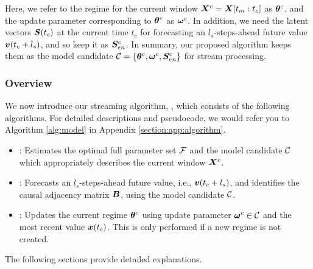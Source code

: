 \noindent Here, we refer to the regime for the current window $\bm{X}^c = \bm{X}[t_m:t_c]$ as $\boldsymbol{\theta}^c$, and the update parameter corresponding to $\boldsymbol{\theta}^c$ as $\boldsymbol{\omega}^c$. In addition, we need the latent vectors $\bm{S}(t_c)$ at the current time $t_c$
for forecasting an $l_s$-steps-ahead future value $\bm{v}(t_c+l_s)$, and so keep it as $\bm{S}^c_{en}$.
In summary, our proposed algorithm keeps them as the model candidate $\mathcal{C} = \{ 
\boldsymbol{\theta}^c, \boldsymbol{\omega}^c, \bm{S}^c_{en} \}$ for stream processing.
\subsubsection{Overview}
We now introduce our streaming algorithm, \method, which consists of the following algorithms.
For detailed descriptions and pseudocode, we would refer you to Algorithm \ref{alg:model} in Appendix \ref{section:app:algorithm}.
{\setlength{\leftmargini}{15pt}
\begin{itemize}
    \item \modelestimator:
    Estimates the optimal full parameter set $\mathcal{F}$ and the model candidate $\mathcal{C}$ which appropriately describes the current window $\bm{X}^c$.
    \item \modelgenerator:
    Forecasts an $l_s$-steps-ahead future value, i.e., $\bm{v}(t_c+l_s)$, and identifies the causal adjacency matrix $\bm{B}$, using the model candidate $\mathcal{C}$.
    \item \regimeupdate:
    Updates the current regime $\boldsymbol{\theta}^c$ using update parameter $\boldsymbol{\omega}^c\in\mathcal{C}$ and the most recent value $\bm{x}(t_c)$. This is only performed if a new regime is not created.
\end{itemize}
}
\noindent
The following sections provide detailed explanations.
